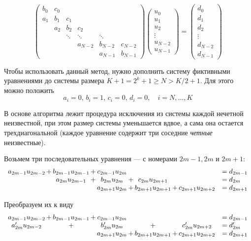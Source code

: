 \documentclass[12pt]{article}
\begin{document}
\[
\begin{pmatrix}
b_0 & c_0 \\
a_1 & b_1 & c_1 \\
& a_2 & b_2 & c_2 \\
&& \ddots & \ddots & \ddots\\
&&& a_{N-2} & b_{N-2} & c_{N-2}\\
&&&& a_{N - 1} & b_{N - 1}
\end{pmatrix}
\begin{pmatrix}
u_0\\u_1\\u_2\\\vdots\\u_{N-2}\\u_{N-1}
\end{pmatrix} = 
\begin{pmatrix}
d_0\\d_1\\d_2\\\vdots\\d_{N-2}\\d_{N-1}
\end{pmatrix}
\]

Чтобы использовать данный метод, нужно дополнить систему
фиктивными уравнениями до системы размера
$K + 1 = 2^k + 1 \geq N > K / 2 + 1$. Для этого можно положить 
\[a_i = 0,\, b_i = 1,\, c_i = 0,\, d_i = 0, \quad i = N, \dots, K\]

В основе алгоритма лежит процедура исключения из системы каждой нечетной
неизвестной, при этом размер системы уменьшается вдвое, а сама она остается
трехдиагональной (каждое уравнение содержит три соседние \emph{четные}
неизвестные).

Возьмем три последовательных уравнения --- с номерами $2m-1, 2m$ и $2m+1$:
\[
\begin{array}{c@{\,}c@{\,}c@{\,}c@{\,}c@{\,}c@{\,}c@{\,}c@{\,}cl}
a_{2m-1} u_{2m-2} &+& b_{2m-1} u_{2m-1} &+& c_{2m-1} u_{2m} &&&&& = d_{2m-1}\\
&&a_{2m} u_{2m-1} &+& b_{2m} u_{2m} &+& c_{2m} u_{2m+1} &&& = d_{2m}\\
&&&&a_{2m+1} u_{2m} &+& b_{2m+1} u_{2m+1} &+& c_{2m+1} u_{2m+2} & = d_{2m+1}
\end{array}
\]

Преобразуем их к виду
\[
\begin{array}{c@{\,}c@{\,}c@{\,}c@{\,}c@{\,}c@{\,}c@{\,}c@{\,}cl}
a_{2m-1} u_{2m-2} &+& b_{2m-1} u_{2m-1} &+& c_{2m-1} u_{2m} &&&&& = d_{2m-1}\\
a'_{2m} u_{2m-2} &&+&& b'_{2m} u_{2m} &&+&& c'_{2m} u_{2m+2} & = d'_{2m}\\
&&&&a_{2m+1} u_{2m} &+& b_{2m+1} u_{2m+1} &+& c_{2m+1} u_{2m+2} & = d_{2m+1}
\end{array}
\]
\end{document}
